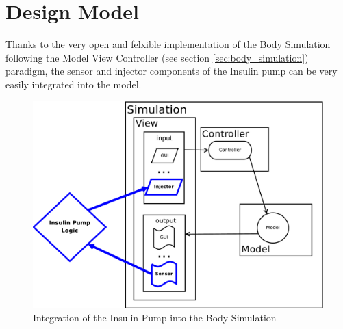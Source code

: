 \section{Design Model}
Thanks to the very open and felxible implementation of the Body Simulation
following the Model View Controller (see section \vref{sec:body_simulation})
paradigm, the sensor and injector components of the Insulin pump can be very
easily integrated into the model.

\begin{figure}[htb]
\centering
\includegraphics[scale=0.39]{images/mvc_insulin_pump}
\caption{Integration of the Insulin Pump into the Body Simulation}
\label{fig:mvc_insulin_pump}
\end{figure}
